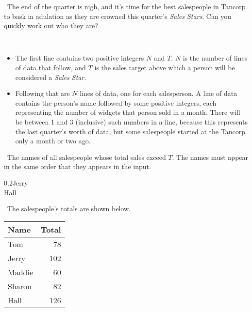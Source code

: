 

\Question\ The end of the quarter is nigh, and it's time for the best salespeople in
\textsf{Tancorp} to bask in adulation as they are crowned this quarter's \emph{Sales
Stars}. Can you quickly work out who they are?

\Input\

\begin{itemize}
  \item The first line contains two positive integers $N$ and $T$. $N$ is the number of
    lines of data that follow, and $T$ is the sales target above which a person will be
    considered a \emph{Sales Star}.
  \item Following that are $N$ lines of data, one for each salesperson. A line of data
    contains the person's name followed by some positive integers, each representing the
    number of widgets that person sold in a month. There will be between 1 and 3
    (inclusive) such numbers in a line, because this represents the last quarter's worth
    of data, but some salespeople started at the \textsf{Tancorp} only a month or two ago.
\end{itemize}

\Output\ The names of all salespeople whose total sales exceed $T$. The names must appear
in the same order that they appears in the input.

\Sample

       {0.2}{Jerry\\Hall}

\Explanation\ The salespeople's totals are shown below.

\begin{center}
  \begin{tabular}{lr}
    \toprule
    Name   & Total \\
    \midrule
    Tom    & 78    \\
    Jerry  & 102   \\
    Maddie & 60    \\
    Sharon & 82    \\
    Hall   & 126   \\
    \bottomrule
  \end{tabular}
\end{center}

